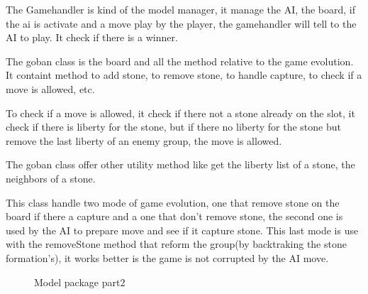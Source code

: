 The Gamehandler is kind of the model manager, it manage the AI, the board, if the ai is activate and a move play by the player, the gamehandler will tell to the AI to play. It check if there is a winner.

The goban class is the board and all the method relative to the game evolution. It containt method to add stone, to remove stone, to handle capture, to check if a move is allowed, etc. 

To check if a move is allowed, it check if there not a stone already on the slot, it check if there is liberty for the stone, but if there no liberty for the stone but remove the last liberty of an enemy group, the move is allowed.

The goban class offer other utility method like get the liberty list of a stone, the neighbors of a stone.

This class handle two mode of game evolution, one that remove stone on the board if there a capture and a one that don't remove stone, the second one is used by the AI to prepare move and see if it capture stone. This last mode is use with the removeStone method that reform the group(by backtraking the stone formation's), it works better is the game is not corrupted by the AI move.

  \begin{figure}[h!]
  \centering
  \caption{Model package part2}
\label{model2} 
 \end{figure}


